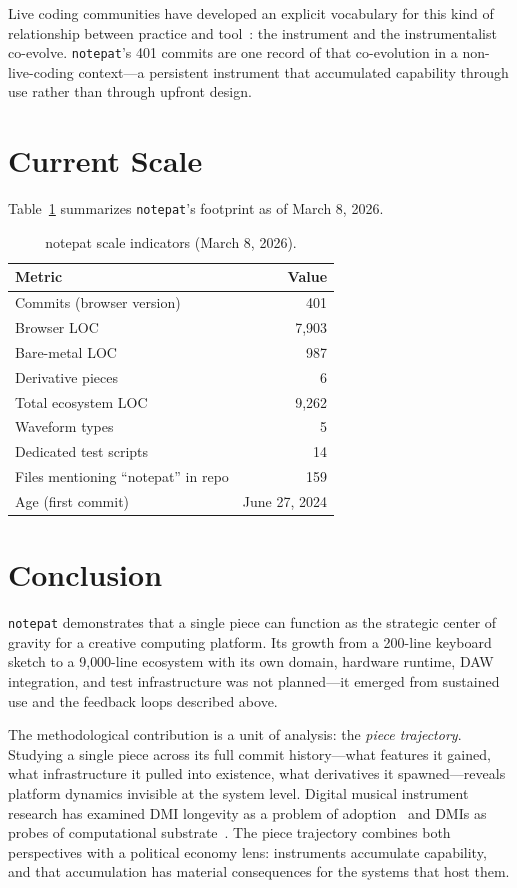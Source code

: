 \documentclass[10pt,letterpaper,twocolumn]{article}
\begin{document}
Live coding communities have developed an explicit vocabulary for this kind of relationship between practice and tool~\citep{blackwell2022livecoding}: the instrument and the instrumentalist co-evolve. \texttt{notepat}'s 401 commits are one record of that co-evolution in a non-live-coding context---a persistent instrument that accumulated capability through use rather than through upfront design.

\section{Current Scale}

Table~\ref{tab:scale} summarizes \texttt{notepat}'s footprint as of March 8, 2026.

\begin{table}[h]
\small
\centering
\begin{tabularx}{\columnwidth}{l r}
\toprule
\textbf{Metric} & \textbf{Value} \\
\midrule
Commits (browser version) & 401 \\
Browser LOC & 7{,}903 \\
Bare-metal LOC & 987 \\
Derivative pieces & 6 \\
Total ecosystem LOC & 9{,}262 \\
Waveform types & 5 \\
Dedicated test scripts & 14 \\
Files mentioning ``notepat'' in repo & 159 \\
Age (first commit) & June 27, 2024 \\
\bottomrule
\end{tabularx}
\caption{notepat scale indicators (March 8, 2026).}
\label{tab:scale}
\end{table}

\section{Conclusion}

\texttt{notepat} demonstrates that a single piece can function as the strategic center of gravity for a creative computing platform. Its growth from a 200-line keyboard sketch to a 9{,}000-line ecosystem with its own domain, hardware runtime, DAW integration, and test infrastructure was not planned---it emerged from sustained use and the feedback loops described above.

The methodological contribution is a unit of analysis: the \emph{piece trajectory}. Studying a single piece across its full commit history---what features it gained, what infrastructure it pulled into existence, what derivatives it spawned---reveals platform dynamics invisible at the system level. Digital musical instrument research has examined DMI longevity as a problem of adoption~\citep{marquez2018dmi} and DMIs as probes of computational substrate~\citep{tahiroglu2020probes}. The piece trajectory combines both perspectives with a political economy lens: instruments accumulate capability, and that accumulation has material consequences for the systems that host them.



\end{document}
